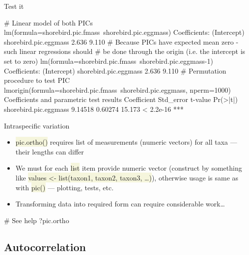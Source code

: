 \documentclass[compress, xelatex, 11pt, xcolor=svgnames, aspectratio=169, url={hyphens, lowtilde}]{beamer}
\renewcommand{\texttt}[1]{\colorbox{Beige}{{\ttfamily #1}}}
\begin{document}
\begin{frame}[fragile]{Test it}
	\label{pic-test}
	\begin{spluscode}
    # Linear model of both PICs
    lm(formula=shorebird.pic.fmass~shorebird.pic.eggmass)
    Coefficients:
          (Intercept)  shorebird.pic.eggmass
                2.636                  9.110
    # Because PICs have expected mean zero - such linear regressions should
    # be done through the origin (i.e. the intercept is set to zero)
    lm(formula=shorebird.pic.fmass~shorebird.pic.eggmass-1)
    Coefficients:
          (Intercept)  shorebird.pic.eggmass
                2.636                  9.110
    # Permutation procedure to test PIC
    lmorigin(formula=shorebird.pic.fmass~shorebird.pic.eggmass, nperm=1000)
    Coefficients and parametric test results 
                          Coefficient Std_error t-value  Pr(>|t|)
    shorebird.pic.eggmass     9.14518   0.60274  15.173 < 2.2e-16 ***
	\end{spluscode}
\end{frame}

\begin{frame}[fragile]{Intraspecific variation}
	\begin{itemize}
		\item \texttt{pic.ortho()} requires list of measurements (numeric vectors) for all taxa --- their lengths can differ
		\item We must for each \texttt{list} item provide numeric vector (construct by something like \texttt{values <- list(taxon1, taxon2, taxon3, \ldots)}), otherwise usage is same as with \texttt{pic()} --- plotting, tests, etc.
		\item Transforming data into required form can require considerable work\ldots
	\end{itemize}
	\begin{spluscode}
    # See help
    ?pic.ortho
	\end{spluscode}
\end{frame}

\subsection{Autocorrelation}
\end{document}
